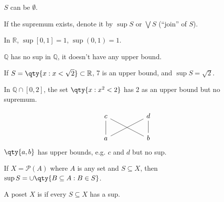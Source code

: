 \begin{note}
    $S$ can be $\emptyset$.
\end{note}

\begin{notation}
    If the supremum exists, denote it by $\sup S$ or $\bigvee S$ (``join'' of $S$).
\end{notation}

\begin{example}
    In $\mathbb{R}$, $\sup [0, 1] = 1$, $\sup (0, 1) = 1$.
\end{example}

\begin{example}
    $\mathbb{Q}$ has no sup in $\mathbb{Q}$, it doesn't have any upper bound.
\end{example}

\begin{example}
    If $S = \qty{x : x < \sqrt{2}} \subset \mathbb R$, 7 is an upper bound, and $\sup S = \sqrt{2}$.

    In $\mathbb Q \cap [0, 2]$, the set $\qty{x : x^2 < 2}$ has 2 as an upper bound but no supremum.
\end{example}

\begin{example}
    \[\begin{tikzcd}
        c && d \\
        a && b
        \arrow[no head, from=2-1, to=1-1]
        \arrow[no head, from=2-3, to=1-3]
        \arrow[no head, from=2-1, to=1-3]
        \arrow[no head, from=2-3, to=1-1]
    \end{tikzcd}\]
    $\qty{a, b}$ has upper bounds, e.g. $c$ and $d$ but no sup.
\end{example}

\begin{example}
    If $X = \mathcal{P}(A)$ where $A$ is any set and $S \subseteq X$, then $\sup S = \cup \qty{B \subseteq A : B \in S}$.
\end{example}

\begin{definition}[Complete]
    A poset $X$ is  if every $S \subseteq X$ has a sup.
\end{definition}

